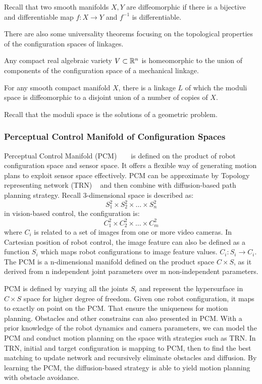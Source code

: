 Recall that two smooth manifolds \(X, Y\) are diffeomorphic if there is a bijective and differentiable map \(f:X\to Y\) and \(f^{-1}\) is differentiable.

There are also some universality theorems focusing on the topological properties of the configuration spaces of linkages.

\begin{theorem}
  Any compact real algebraic variety \(V\subset \mathbb{R}^n\) is homeomorphic to the union of components of the configuration space of a mechanical linkage.
\end{theorem}

\begin{theorem}
  For any smooth compact manifold \(X\), there is a linkage \(L\) of which the moduli space is diffeomorphic to a disjoint union of a number of copies of \(X\).
\end{theorem}
Recall that the moduli space is the solutions of a geometric problem.

\subsubsection{Perceptual Control Manifold of Configuration Spaces}
Perceptual Control Manifold (PCM) ~\cite{zeller1997motion} ~\cite{sharma1997framework} is defined on the product of robot configuration space and sensor space. It offers a flexible way of generating motion plans to exploit sensor space effectively. PCM can be approximate by Topology representing network (TRN) ~\cite{martinetz1994topology} and then combine with diffusion-based path planning strategy. Recall 3-dimensional space is described as:
\[S^2_1\times S^2_2\times\dots\times S^2_n\]
in vision-based control, the configuration is:
\[C^2_1\times C^2_2\times\dots\times C^2_m\]
where \(C_i\) is related to a set of images from one or more video cameras. In Cartesian position of robot control, the image feature can also be defined as a function \(S_i\) which maps robot configurations to image feature values. \(C_i:S_i\rightarrow  C_i.\) The PCM is a n-dimensional manifold defined on the product space \(C \times S\), as it derived from n independent joint parameters over m non-independent parameters.

PCM is defined by varying all the joints \(S_i\) and  represent the hypersurface in  \(C \times S\) space for higher degree of freedom. Given one robot configuration, it maps to exactly on point on the PCM. That ensure the uniqueness for motion planning. Obstacles and other constrains can also presented in PCM. With a prior knowledge of the robot dynamics and camera parameters, we can model the PCM and conduct motion planning on the space with strategies such as TRN. In TRN, initial and target configuration is mapping to PCM, then to find the best matching to update network and recursively eliminate obstacles and diffusion. By learning the PCM, the diffusion-based strategy is able to yield motion planning with obstacle avoidance.



